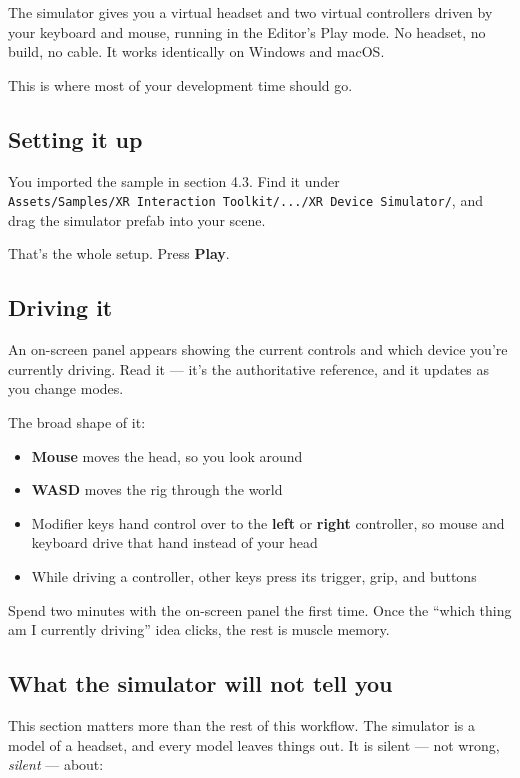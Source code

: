 \documentclass[11pt,a4paper]{article}
\providecommand{\tightlist}{\setlength{\itemsep}{2pt}\setlength{\parskip}{0pt}}
\begin{document}
The simulator gives you a virtual headset and two virtual controllers driven by your
keyboard and mouse, running in the Editor's Play mode. No headset, no build, no cable.
It works identically on Windows and macOS.

This is where most of your development time should go.

\subsection{Setting it up}\label{setting-it-up}

You imported the sample in section 4.3. Find it under
\texttt{Assets/Samples/XR\ Interaction\ Toolkit/.../XR\ Device\ Simulator/}, and drag the simulator
prefab into your scene.

That's the whole setup. Press \textbf{Play}.

\subsection{Driving it}\label{driving-it}

An on-screen panel appears showing the current controls and which device you're currently
driving. Read it --- it's the authoritative reference, and it updates as you change modes.

The broad shape of it:

\begin{itemize}
\tightlist
\item
  \textbf{Mouse} moves the head, so you look around
\item
  \textbf{WASD} moves the rig through the world
\item
  Modifier keys hand control over to the \textbf{left} or \textbf{right} controller, so mouse and
  keyboard drive that hand instead of your head
\item
  While driving a controller, other keys press its trigger, grip, and buttons
\end{itemize}

Spend two minutes with the on-screen panel the first time. Once the ``which thing am I
currently driving'' idea clicks, the rest is muscle memory.

\subsection{What the simulator will not tell you}\label{what-the-simulator-will-not-tell-you}

This section matters more than the rest of this workflow. The simulator is a model of a
headset, and every model leaves things out. It is silent --- not wrong, \emph{silent} --- about:
\end{document}
